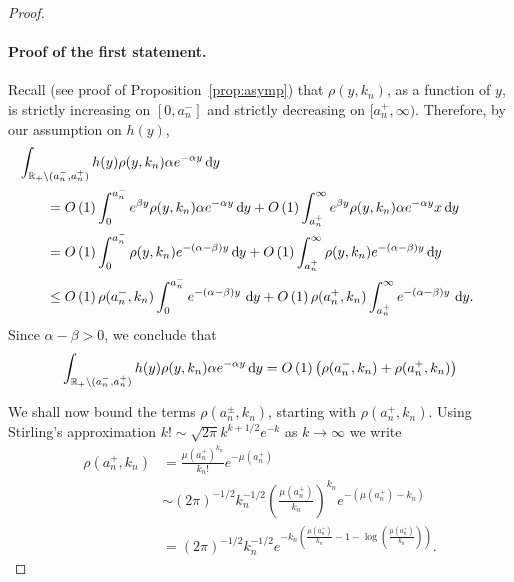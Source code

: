 \begin{proof}\hfill

\paragraph{Proof of the first statement.}
Recall (see proof of Proposition~\ref{prop:asymp}) that $\rho(y,k_n)$, as a function of $y$, is strictly increasing on $[0,a_n^-]$ and strictly decreasing on $[a_n^+,\infty)$. Therefore, by our assumption on $h(y)$,
\begin{align*}
	&\hspace{-20pt}\int_{\R_+ \setminus (a_n^-, a_n^+)} h(y) \rho(y,k_n) 
		\alpha e^{-\alpha y} \dd y\\
    &= \bigO{1} \int_0^{a_n^-} e^{\beta y} \rho(y,k_n) \alpha e^{-\alpha y} \dd y 
    	+ \bigO{1}\int_{a_n^+}^{\infty} e^{\beta y} \rho(y,k_n) \alpha e^{-\alpha y}x \dd y \\
    &= \bigO{1} \int_0^{a_n^-} \rho(y,k_n) e^{-(\alpha-\beta) y} \dd y 
   		+ \bigO{1} \int_{a_n^+}^{\infty} \rho(y,k_n) e^{-(\alpha-\beta) y} \dd y\\
   	&\le \bigO{1}\rho(a_n^-,k_n)\int_0^{a_n^-} e^{-(\alpha-\beta) y} \, \dd y
   		+ \bigO{1} \rho(a_n^+,k_n) \int_{a_n^+}^{\infty} e^{-(\alpha-\beta) y} \, \dd y.
\end{align*}
Since $\alpha - \beta > 0$, we conclude that
\begin{equation}\label{eq:concentration_lemma_integral_bound}
	\int_{{\mathbb R}_+ \setminus (a_n^-, a_n^+)} h(y) \rho(y,k_n) \alpha e^{-\alpha y} \operatorname{\mathrm{d}\hspace{-2pt}} y
	= O\left(1\right) \left(\rho(a_n^-,k_n) + \rho(a_n^+,k_n)\right) 
\end{equation}

We shall now bound the terms $\rho(a_n^\pm,k_n)$, starting with $\rho(a_n^+,k_n)$.  Using Stirling's approximation $k! \sim \sqrt{2\pi} k^{k + 1/2} e^{-k}$ as $k \to \infty$ we write
\begin{align*}
	\rho(a_n^+,k_n) &= \frac{\mu(a_n^+)^{k_n}}{k_n!} e^{-\mu(a_n^+)} \\
	&\sim (2\pi)^{-1/2} k_n^{-1/2} \left(\frac{\mu(a_n^+)}{k_n}\right)^{k_n} e^{-(\mu(a_n^+) - k_n)}\\
	&= (2\pi)^{-1/2} k_n^{-1/2} 
		e^{-k_n\left(\frac{\mu(a_n^+)}{k_n} - 1 - \log\left(\frac{\mu(a_n^+)}{k_n}\right)\right)}.
\end{align*}


\end{proof}
